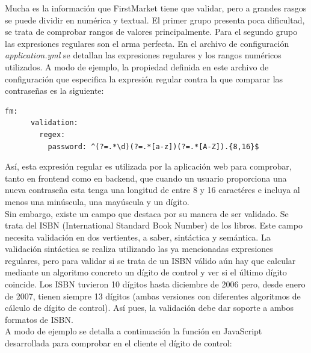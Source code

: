 \documentclass[a4paper]{report}
\begin{document}
    Mucha es la información que FirstMarket tiene que validar, pero a grandes rasgos se puede dividir en numérica y textual. El primer grupo presenta poca dificultad, se trata de comprobar rangos de valores principalmente. Para el segundo grupo las expresiones regulares son el arma perfecta. En el archivo de configuración \emph{application.yml} se detallan las expresiones regulares y los rangos numéricos utilizados. A modo de ejemplo, la propiedad definida en este archivo de configuración que especifica la expresión regular contra la que comparar las contraseñas es la siguiente:
    \\
     
    \begin{lstlisting}[caption=Expresión regular para las contraseñas]
    fm:
      validation:
        regex:
          password: ^(?=.*\d)(?=.*[a-z])(?=.*[A-Z]).{8,16}$
    \end{lstlisting}
    
    Así, esta expresión regular es utilizada por la aplicación web para comprobar, tanto en frontend como en backend, que cuando un usuario proporciona una nueva contraseña esta tenga una longitud de entre 8 y 16 caractéres e incluya al menos una minúscula, una mayúscula y un dígito.
    \\
    
    Sin embargo, existe un campo que destaca por su manera de ser validado. Se trata del ISBN (International Standard Book Number) de los libros. Este campo necesita validación en dos vertientes, a saber, sintáctica y semántica. La validación sintáctica se realiza utilizando las ya mencionadas expresiones regulares, pero para validar si se trata de un ISBN válido aún hay que calcular mediante un algoritmo concreto un dígito de control y ver si el último dígito coincide. Los ISBN tuvieron 10 dígitos hasta diciembre de 2006 pero, desde enero de 2007, tienen siempre 13 dígitos (ambas versiones con diferentes algoritmos de cálculo de dígito de control). Así pues, la validación debe dar soporte a ambos formatos de ISBN.
    \\
    
    A modo de ejemplo se detalla a continuación la función en JavaScript desarrollada para comprobar en el cliente el dígito de control:
    \\
    
\end{document}
